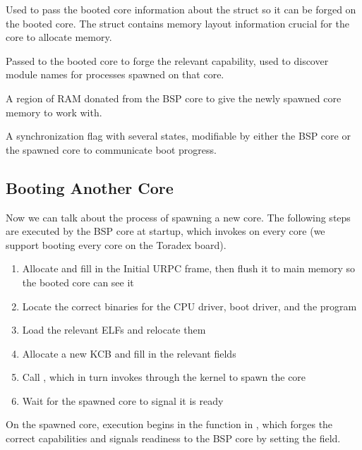 \begin{description}
    \setlength{\itemsep}{2pt}
    \item[\co{bootinfo_frame_base}, \co{bootinfo_frame_bytes}] Used to pass the booted core
        information about the  struct so it can be forged on the booted core.
        The  struct contains memory layout information crucial for the core to
        allocate memory.
    \item[\co{mmstr_frame_base}, \co{mmstr_frame_bytes}] Passed to the booted core to forge
        the relevant capability, used to discover module names for processes spawned on that core.
    \item[\co{ram_base}, \co{ram_bytes}] A region of RAM donated from the BSP core to give the
        newly spawned core memory to work with.
    \item[\co{state}] A synchronization flag with several states, modifiable by either the BSP
        core or the spawned core to communicate boot progress.
\end{description}

\subsection{Booting Another Core}
Now we can talk about the process of spawning a new core. The following steps are executed by the
BSP core at startup, which invokes  on every core (we support booting
every core on the Toradex board).
\begin{enumerate}
    \itemsep-0.5em
    \item Allocate and fill in the Initial URPC frame, then flush it to main memory so the booted core can see it
    \item Locate the correct binaries for the CPU driver, boot driver, and the  program
    \item Load the relevant ELFs and relocate them
    \item Allocate a new KCB and fill in the relevant fields
    \item Call , which in turn invokes  through the kernel to spawn the core
    \item Wait for the spawned core to signal it is ready
\end{enumerate}
On the spawned core, execution begins in the  function in ,
which forges the correct capabilities and signals readiness to the BSP core by setting the
 field.


